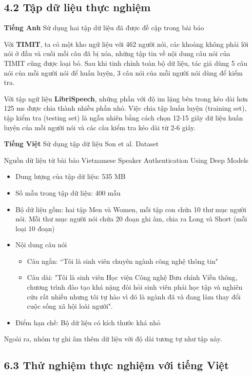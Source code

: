 \documentclass{article}
\begin{document}
	\subsection{4.2 Tập dữ liệu thực nghiệm}
	\qquad \textbf{Tiếng Anh} Sử dụng hai tập dữ liệu đã được đề cập trong bài báo

	Với \textbf{TIMIT}, ta có một kho ngữ liệu với 462 người nói, các khoảng không phải lời nói ở đầu và cuối mỗi câu đã bị xóa, những tập tin về nội dung câu nói của TIMIT cũng được loại bỏ. Sau khi tinh chỉnh toàn bộ dữ liệu, tác giả dùng 5 câu nói của mỗi người nói để huấn luyện, 3 câu nói của mỗi người nói dùng để kiểm tra.
	
	Với tập ngữ liệu \textbf{LibriSpeech}, những phần với độ im lặng bên trong kéo dài hơn 125 ms được chia thành nhiều phần nhỏ. Việc chia tập huấn luyện (training set), tập kiểm tra (testing set) là ngẫu nhiên bằng cách chọn 12-15 giây dữ liệu huấn luyện của mỗi người nói và các câu kiểm tra kéo dài từ 2-6 giây. 
	
	\textbf{Tiếng Việt} Sử dụng tập dữ liệu Son et al. Dataset
	
	Nguồn dữ liệu từ bài báo Vietnamese Speaker Authentication Using Deep Models
	\begin{itemize}
		\item Dung lượng của tập dữ liệu: 535 MB
		\item Số mẫu trong tập dữ liệu: 400 mẫu
		\item Bộ dữ liệu gồm: hai tập  Men và Women, mỗi tập con chứa 10 thư mục người nói. Mỗi thư mục người nói chứa 20 đoạn ghi âm, chia ra Long và Short (mỗi loại 10 đoạn) 
		\item Nội dung câu nói
		\begin{itemize}
			\item Câu ngắn: “Tôi là sinh viên chuyên ngành công nghệ thông tin"
			\item Câu dài: "Tôi là sinh viên Học viện Công nghệ Bưu chính Viễn thông, chương trình đào tạo khá nặng đòi hỏi sinh viên phải học tập và nghiên cứu rất nhiều nhưng tôi tự hào vì đó là ngành đã và đang làm thay đổi cuộc sống xã hội loài người".
		\end{itemize}
		\item Điểm hạn chế: Bộ dữ liệu có kích thước khá nhỏ
	\end{itemize}
	
	Ngoài ra, nhóm tự ghi âm thêm dữ liệu với độ dài tương tự như tập này.
	\subsection{6.3 Thử nghiệm thực nghiệm với tiếng Việt}
\end{document}
